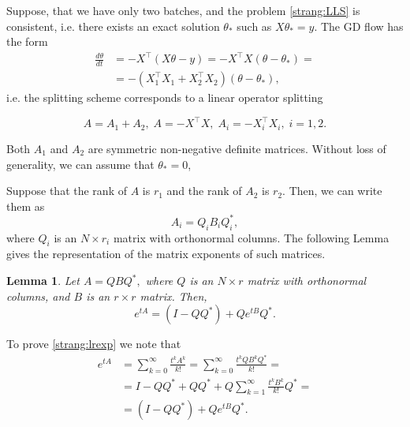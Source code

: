 \documentclass{article}
\newtheorem{lemma}{Lemma}
\begin{document}
Suppose, that we have only two batches, and the problem \eqref{strang:LLS} is consistent, i.e. there exists an exact solution $\theta_*$ such as $X \theta_* = y$. The GD flow has the form
\begin{equation}\label{strang:model1}
\begin{split}
    \frac{d \theta}{d t} &= -X^{\top} (X \theta - y) = -X^{\top} X(\theta - \theta_*) =\\ &= -(X_1^{\top} X_1 + X^{\top}_2 X_2)(\theta - \theta_*),
\end{split}
\end{equation}
i.e. the splitting scheme corresponds to a linear operator splitting

\begin{equation*}
A = A_1 + A_2, \; A = -X^{\top} X, \; A_i = -X^{\top}_i X_i, \; i = 1, 2.
\end{equation*}

Both $A_1$ and $A_2$ are symmetric non-negative definite matrices. Without loss of generality, we can assume that $\theta_* = 0$,

Suppose that the rank of $A$ is $r_1$ and the rank of $A_2$ is $r_2$. Then, we can write them as
\begin{equation*}
A_i = Q_i B_i Q^*_i,
\end{equation*}
where $Q_i$ is an $N \times r_i$ matrix with orthonormal columns.  The following Lemma gives the representation of the matrix exponents of such matrices.
\begin{lemma}\label{strang:lemexp}
Let $A = Q B Q^*,$ where $Q$ is an $N \times r$ matrix with orthonormal columns, and $B$ is an $r \times r$ matrix. Then,
\begin{equation}\label{strang:lrexp}
    e^{t A}  = (I - QQ^*) + Q e^{t B} Q^*.
\end{equation}
\end{lemma}
To prove \eqref{strang:lrexp} we note that
\begin{equation*}
\begin{split}
e^{t A} &= \sum_{k=0}^{\infty} \frac{t^k A^k}{k!} = \sum_{k=0}^{\infty} \frac{t^k Q B^k Q^*}{k!} = \\ &= I - QQ^* + QQ^* + Q \sum_{k=1}^{\infty} \frac{t^k B^k}{k!} Q^* = \\ &= (I - QQ^*) + Q e^{t B} Q^*.
\end{split}
\end{equation*}
\end{document}
